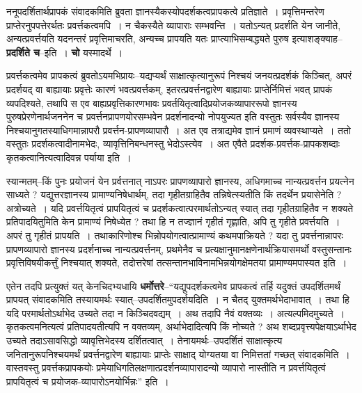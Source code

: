 \documentclass[article,12pt,a4paper]{memoir}
\begin{document}
	  \endgroup
	

	  \pstart ननूपदर्शितार्थप्रापकं संवादकमिति ब्रुवता ज्ञानस्यैकस्योपदर्शकत्वप्रापकत्वे प्रतिज्ञाते । प्रवृत्तिमन्तरेण प्राप्तेरनुपपत्तेरर्थतः प्रवर्त्तकत्वमपि । न चैकस्यैते व्यापाराः सम्भवन्ति । यतोऽन्यत् प्रदर्शति येन जानीते, अन्यत्प्रवर्त्तयति यदनन्तरं प्रवृत्तिमाचरति, अन्यच्च प्रापयति यतः प्राप्त्याभिसम्बद्ध्यते पुरुष इत्याशङ्क्याह--\textbf{प्रदर्शिते च}--इति । \textbf{चो} यस्मादर्थे ।
	\pend
      

	  \pstart प्रवर्त्तकत्वमेव प्रापकत्वं ब्रुवतोऽयमभिप्रायः--यद्यप्यर्थं साक्षात्कृत्यानुरूपं निश्चयं जनयत्प्रदर्शकं किञ्चित्, अपरं प्रदर्शयद् वा बाह्यायाः प्रवृत्तेः कारणं भवत्प्रवर्त्तकम्, इतरत्प्रवर्त्तनद्वारेण बाह्यायाः प्राप्तेर्निमित्तं भवत् प्रापकं व्यपदिश्यते, तथापि स एव बाह्यप्रवृत्तिकारणभावः प्रवर्तयितृत्वादिप्रयोजकव्यापाररूपो ज्ञानस्य पुरुषप्रेरणेनार्थजननेन च प्रवर्त्तनप्रापणयोरसम्भवेन प्रदर्शनादन्यो नोपयुज्यत इति वस्तुतः सर्वस्यैव ज्ञानस्य निश्चयानुगतस्याधिगमान्नापरौ प्रवर्त्तन-प्रापणव्यापारौ । अत एव तत्राद्यमेव ज्ञानं प्रमाणं व्यवस्थाप्यते । ततो वस्तुतः प्रदर्शकत्वादीनामभेदः, व्यावृत्तिनिबन्धनस्तु भेदोऽस्त्येव । अत एवैते प्रदर्शक-प्रवर्त्तक-प्रापकशब्दाः कृतकत्वानित्यत्वादिवन्न पर्याया इति ।
	\pend
      

	  \pstart स्यान्मतम्--किं पुनः प्रयोजनं येन प्रर्वत्तनात् नाऽपरः प्रापणव्यापारो ज्ञानस्य, अधिगमाच्च नान्यत्प्रवर्त्तन प्रयत्नेन साध्यते ? यद्युत्तरज्ञानस्य प्रामाण्यनिषेधार्थम्, तदा गृहीतग्राहितैव तन्निषेत्स्य\leavevmode{}तीति किं तदर्थेन प्रयासेनेति ? अत्रोच्यते । यदि प्रवर्त्तयितृत्वं प्रापयितृत्वं च प्रदर्शकत्वात्परमार्थतोऽन्यत् स्यात् तदा गृहीतग्राहितैव न शक्यते प्रतिपादयितुमिति केन प्रामाण्यं निषेध्येत ? तथा हि न तज्ज्ञानं गृहीतं गृह्णाति, अपि तु गृहीते प्रवर्त्तयति । अपरं तु गृहीतं प्रापयति । तथाकारिणोश्च भिन्नोपयोगत्वात्प्रामाण्यं कथमपाक्रियते ? यदा तु प्रवर्त्तनान्नापरः प्रापणव्यापारो ज्ञानस्य प्रदर्शनाच्च नान्यत्प्रवर्त्तनम्, प्रथमेनैव च प्रत्यक्षानुमानक्षणेनार्थक्रियासमर्थो वस्तुसन्तानः प्रवृत्तिविषयीकर्त्तुं निश्चयात् शक्यते, तदोत्तरेषां तत्सन्तानभाविनामभिन्नयोगक्षेमतया प्रामाण्यमपास्यत इति ।
	\pend
      

	  \pstart एतेन तदपि प्रत्युक्तं यत् केनचिदभ्यधायि \textbf{धर्मोत्तरे}--“यद्युपदर्शकत्वमेव प्रापकत्वं तर्हि यदुक्तं उपदर्शितमर्थं प्रापयत् संवादकमिति तस्यायमर्थः स्यात्--उपदर्शितमुपदर्शयदिति । न चैतद् युक्तमर्थभेदाभावात् । तथा हि यदि परमार्थतोऽर्थाभेद उच्यते तदा न किञ्चिदवद्यम् । अथ तदापि नैवं वक्तव्यः । अत्यल्पमिदमुच्यते । कृतकत्वमनित्यत्वं प्रतिपादयतीत्यपि न वक्तव्यम्, अर्थाभेदादित्यपि किं नोच्यते ? अथ शब्दप्रवृत्त्यपेक्षयाऽर्थाभेद उच्यते तदाऽसावसिद्धो व्यावृत्तिभेदस्य दर्शितत्वात् । तेनायमर्थः--उपदर्शितं साक्षात्कृत्य जनितानुरूपनिश्चयमर्थं प्रवर्त्तनद्वारेण बाह्यायाः प्राप्तेः साक्षाद् योग्यतया वा निमित्ततां गच्छत् संवादकमिति । वास्तवस्तु प्रवर्त्तकप्रापकयोः प्रमेयाधिगतिलक्षणात्प्रदर्शनव्यापारादन्यो व्यापारो नास्तीति न प्रवर्त्तयितृत्वं प्रापयितृत्वं च प्रयोजक-व्यापारोऽनयोर्भिन्नः” इति ।
	\pend
      \leavevmode{}
	  \bigskip
	  \begingroup
	
\end{document}
